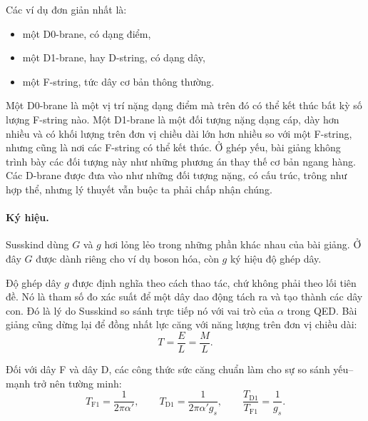 Các ví dụ đơn giản nhất là:
\begin{itemize}
\item một D0-brane, có dạng điểm,
\item một D1-brane, hay D-string, có dạng dây,
\item một F-string, tức dây cơ bản thông thường.
\end{itemize}
Một D0-brane là một vị trí nặng dạng điểm mà trên đó có thể kết thúc bất kỳ số lượng F-string nào. Một D1-brane là một đối tượng nặng dạng cáp, dày hơn nhiều và có khối lượng trên đơn vị chiều dài lớn hơn nhiều so với một F-string, nhưng cũng là nơi các F-string có thể kết thúc. Ở ghép yếu, bài giảng không trình bày các đối tượng này như những phương án thay thế cơ bản ngang hàng. Các D-brane được đưa vào như những đối tượng nặng, có cấu trúc, trông như hợp thể, nhưng lý thuyết vẫn buộc ta phải chấp nhận chúng.


\paragraph{Ký hiệu.}
Susskind dùng \(G\) và \(g\) hơi lỏng lẻo trong những phần khác nhau của bài giảng. Ở đây \(G\) được dành riêng cho ví dụ boson hóa, còn \(g\) ký hiệu độ ghép dây.

Độ ghép dây \(g\) được định nghĩa theo cách thao tác, chứ không phải theo lối tiên đề. Nó là tham số đo xác suất để một dây dao động tách ra và tạo thành các dây con. Đó là lý do Susskind so sánh trực tiếp nó với vai trò của \(\alpha\) trong QED. Bài giảng cũng dừng lại để đồng nhất lực căng với năng lượng trên đơn vị chiều dài:
\begin{equation}
T=\frac{E}{L}=\frac{M}{L}.
\end{equation}

Đối với dây F và dây D, các công thức sức căng chuẩn làm cho sự so sánh yếu--mạnh trở nên tường minh:
\begin{equation}
T_{\mathrm{F1}}=\frac{1}{2\pi\alpha'},
\qquad
T_{\mathrm{D1}}=\frac{1}{2\pi\alpha' g_s},
\qquad
\frac{T_{\mathrm{D1}}}{T_{\mathrm{F1}}}=\frac{1}{g_s}.
\end{equation}

